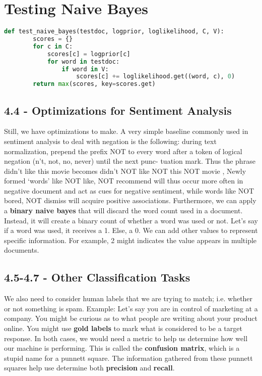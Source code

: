 \documentclass{article}
\begin{document}
\section*{Testing Naive Bayes}

\begin{lstlisting}[language=Python]
    def test_naive_bayes(testdoc, logprior, loglikelihood, C, V):
        scores = {}
        for c in C:
            scores[c] = logprior[c]
            for word in testdoc:
                if word in V:
                    scores[c] += loglikelihood.get((word, c), 0)
        return max(scores, key=scores.get)
    \end{lstlisting}

\subsection{4.4 - Optimizations for Sentiment Analysis}

Still, we have optimizations to make. A very simple baseline commonly used in sentiment analysis to deal with
negation is the following: during text normalization, prepend the prefix NOT to
every word after a token of logical negation (n’t, not, no, never) until the next punc-
tuation mark. Thus the phrase
didn’t like this movie  becomes didn’t NOT like NOT this NOT movie ,
Newly formed ‘words’ like NOT like, NOT recommend will thus occur more
often in negative document and act as cues for negative sentiment, while words
like NOT bored, NOT dismiss will acquire positive associations.
Furthermore, we can apply a \textbf{binary naive bayes} that will discard the word count used in a document. Instead, it will
create a binary count of whether a word was used or not. Let's say if a word was used, it receives a 1. Else, a 0. We can add other values to represent
specific information. For example, 2 might indicates the value appears in multiple documents.
\subsection{4.5-4.7 - Other Classification Tasks}
We also need to consider human labels that we are trying to match; i.e. whether or not something is spam. Example: Let's say you are in control of marketing at a company. You might be
curious as to what people are writing about your product online. You might use \textbf{gold labels} to mark what is considered to be a target response.
In both cases, we would need a metric to
help us determine how well our machine is performing. This is called the \textbf{confusion matrix}, which is a stupid name for a punnett square.
The information gathered from these punnett squares help use determine both \textbf{precision} and \textbf{recall}.
\end{document}
